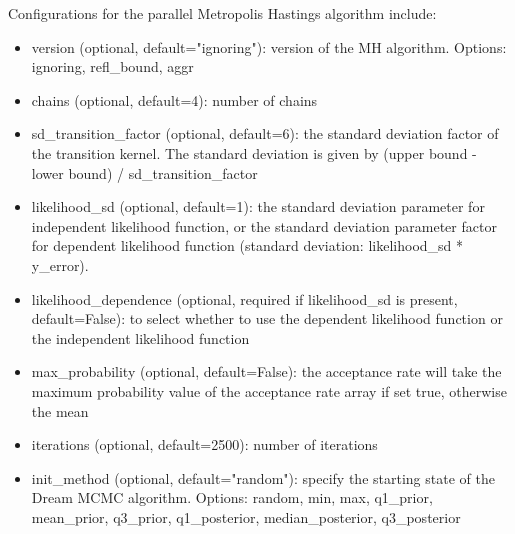Configurations for the parallel Metropolis Hastings algorithm include:
\begin{itemize}
    \item version (optional, default="ignoring"): version of the MH algorithm. Options: ignoring, refl\_bound, aggr
    \item chains (optional, default=4): number of chains
    \item sd\_transition\_factor (optional, default=6): the
    standard deviation factor of the transition kernel. The standard deviation is given by (upper bound - lower bound) / sd\_transition\_factor
    \item likelihood\_sd (optional, default=1): the standard deviation parameter for independent likelihood function, or the standard deviation parameter factor for dependent likelihood function (standard deviation: likelihood\_sd * y\_error).
    \item likelihood\_dependence (optional, required if likelihood\_sd is present, default=False): to select whether to use the dependent likelihood function or the independent likelihood function
    \item max\_probability (optional, default=False): the acceptance rate will take the maximum probability value of the acceptance rate array if set true, otherwise the mean
    \item iterations (optional, default=2500): number of iterations
    \item init\_method (optional, default="random"): specify the starting state of the Dream MCMC algorithm. Options: random, min, max, q1\_prior, mean\_prior, q3\_prior, q1\_posterior, median\_posterior, q3\_posterior
\end{itemize}

